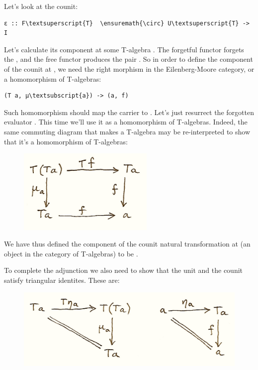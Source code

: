 Let's look at the counit:

\begin{Verbatim}[commandchars=\\\{\}]
ε :: F\textsuperscript{T}  \ensuremath{\circ} U\textsuperscript{T} -> I
\end{Verbatim}
Let's calculate its component at some T-algebra . The
forgetful functor forgets the , and the free functor produces
the pair . So in order to define the component of
the counit  at , we need the right morphism in
the Eilenberg-Moore category, or a homomorphism of T-algebras:

\begin{Verbatim}[commandchars=\\\{\}]
(T a, μ\textsubscript{a}) -> (a, f)
\end{Verbatim}
Such homomorphism should map the carrier  to .
Let's just resurrect the forgotten evaluator . This time we'll
use it as a homomorphism of T-algebras. Indeed, the same commuting
diagram that makes  a T-algebra may be re-interpreted to show
that it's a homomorphism of T-algebras:

\begin{figure}[H]
\centering
\includegraphics[width=2.57292in]{images/talg31.png}
\end{figure}

\noindent
We have thus defined the component of the counit natural transformation
 at  (an object in the category of T-algebras)
to be .

To complete the adjunction we also need to show that the unit and the
counit satisfy triangular identites. These are:

\begin{figure}[H]
\centering
\includegraphics[width=\textwidth]{images/talg4.png}
\end{figure}

